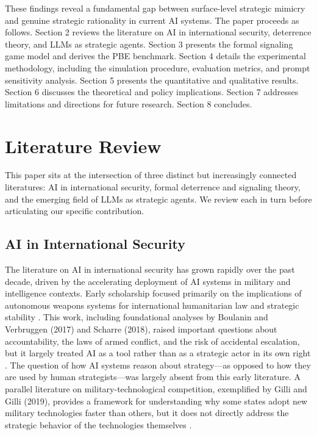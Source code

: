 \documentclass[12pt]{article}
\theoremstyle{plain}
\theoremstyle{definition}
\begin{document}
These findings reveal a fundamental gap between surface-level strategic mimicry and genuine strategic rationality in current AI systems. The paper proceeds as follows. Section 2 reviews the literature on AI in international security, deterrence theory, and LLMs as strategic agents. Section 3 presents the formal signaling game model and derives the PBE benchmark. Section 4 details the experimental methodology, including the simulation procedure, evaluation metrics, and prompt sensitivity analysis. Section 5 presents the quantitative and qualitative results. Section 6 discusses the theoretical and policy implications. Section 7 addresses limitations and directions for future research. Section 8 concludes.

\section{Literature Review}

This paper sits at the intersection of three distinct but increasingly connected literatures: AI in international security, formal deterrence and signaling theory, and the emerging field of LLMs as strategic agents. We review each in turn before articulating our specific contribution.

\subsection{AI in International Security}

The literature on AI in international security has grown rapidly over the past decade, driven by the accelerating deployment of AI systems in military and intelligence contexts. Early scholarship focused primarily on the implications of autonomous weapons systems for international humanitarian law and strategic stability \citep{Horowitz2016}. This work, including foundational analyses by Boulanin and Verbruggen (2017) and Scharre (2018), raised important questions about accountability, the laws of armed conflict, and the risk of accidental escalation, but it largely treated AI as a tool rather than as a strategic actor in its own right \citep{Boulanin2017, Scharre2018}. The question of how AI systems reason about strategy---as opposed to how they are used by human strategists---was largely absent from this early literature. A parallel literature on military-technological competition, exemplified by Gilli and Gilli (2019), provides a framework for understanding why some states adopt new military technologies faster than others, but it does not directly address the strategic behavior of the technologies themselves \citep{Gilli2019}.
\end{document}
